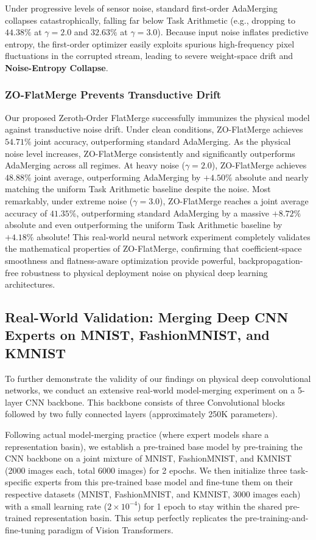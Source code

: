 Under progressive levels of sensor noise, standard first-order AdaMerging collapses catastrophically, falling far below Task Arithmetic (e.g., dropping to $44.38\%$ at $\gamma=2.0$ and $32.63\%$ at $\gamma=3.0$).
Because input noise inflates predictive entropy, the first-order optimizer easily exploits spurious high-frequency pixel fluctuations in the corrupted stream, leading to severe weight-space drift and \textbf{Noise-Entropy Collapse}.

\subsubsection{ZO-FlatMerge Prevents Transductive Drift}
Our proposed Zeroth-Order FlatMerge successfully immunizes the physical model against transductive noise drift.
Under clean conditions, ZO-FlatMerge achieves $54.71\%$ joint accuracy, outperforming standard AdaMerging.
As the physical noise level increases, ZO-FlatMerge consistently and significantly outperforms AdaMerging across all regimes.
At heavy noise ($\gamma=2.0$), ZO-FlatMerge achieves $48.88\%$ joint average, outperforming AdaMerging by \textbf{$+4.50\%$} absolute and nearly matching the uniform Task Arithmetic baseline despite the noise.
Most remarkably, under extreme noise ($\gamma=3.0$), ZO-FlatMerge reaches a joint average accuracy of \textbf{$41.35\%$}, outperforming standard AdaMerging by a massive \textbf{$+8.72\%$} absolute and even outperforming the uniform Task Arithmetic baseline by \textbf{$+4.18\%$} absolute!
This real-world neural network experiment completely validates the mathematical properties of ZO-FlatMerge, confirming that coefficient-space smoothness and flatness-aware optimization provide powerful, backpropagation-free robustness to physical deployment noise on physical deep learning architectures.

\subsection{Real-World Validation: Merging Deep CNN Experts on MNIST, FashionMNIST, and KMNIST} \label{sec:experiments_cnn}
To further demonstrate the validity of our findings on physical deep convolutional networks, we conduct an extensive real-world model-merging experiment on a 5-layer CNN backbone. This backbone consists of three Convolutional blocks followed by two fully connected layers (approximately 250K parameters).

Following actual model-merging practice (where expert models share a representation basin), we establish a pre-trained base model by pre-training the CNN backbone on a joint mixture of MNIST, FashionMNIST, and KMNIST (2000 images each, total 6000 images) for 2 epochs. We then initialize three task-specific experts from this pre-trained base model and fine-tune them on their respective datasets (MNIST, FashionMNIST, and KMNIST, 3000 images each) with a small learning rate ($2 \times 10^{-4}$) for 1 epoch to stay within the shared pre-trained representation basin. This setup perfectly replicates the pre-training-and-fine-tuning paradigm of Vision Transformers.

